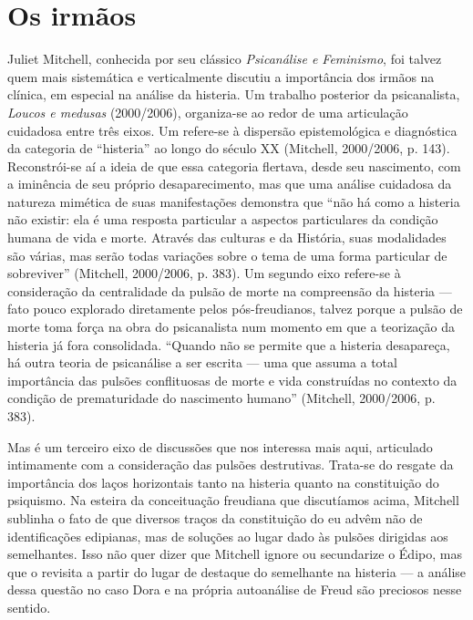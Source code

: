 \section{Os irmãos}

Juliet Mitchell, conhecida por seu clássico \emph{Psicanálise e
Feminismo}, foi talvez quem mais sistemática e verticalmente discutiu a
importância dos irmãos na clínica, em especial na análise da histeria.
Um trabalho posterior da psicanalista, \emph{Loucos e medusas}
(2000/2006), organiza-se ao redor de uma articulação cuidadosa entre
três eixos. Um refere-se à dispersão epistemológica e diagnóstica da
categoria de ``histeria'' ao longo do século XX (Mitchell, 2000/2006, p.
143). Reconstrói-se aí a ideia de que essa categoria flertava, desde seu
nascimento, com a iminência de seu próprio desaparecimento, mas que uma
análise cuidadosa da natureza mimética de suas manifestações demonstra
que ``não há como a histeria não existir: ela é uma resposta particular
a aspectos particulares da condição humana de vida e morte. Através das
culturas e da História, suas modalidades são várias, mas serão todas
variações sobre o tema de uma forma particular de sobreviver''
(Mitchell, 2000/2006, p. 383). Um segundo eixo refere-se à consideração
da centralidade da pulsão de morte na compreensão da histeria --- fato
pouco explorado diretamente pelos pós-freudianos, talvez porque a pulsão
de morte toma força na obra do psicanalista num momento em que a
teorização da histeria já fora consolidada. ``Quando não se permite que
a histeria desapareça, há outra teoria de psicanálise a ser escrita ---
uma que assuma a total importância das pulsões conflituosas de morte e
vida construídas no contexto da condição de prematuridade do nascimento
humano'' (Mitchell, 2000/2006, p. 383).

Mas é um terceiro eixo de discussões que nos interessa mais aqui,
articulado intimamente com a consideração das pulsões destrutivas.
Trata-se do resgate da importância dos laços horizontais tanto na
histeria quanto na constituição do psiquismo. Na esteira da conceituação
freudiana que discutíamos acima, Mitchell sublinha o fato de que
diversos traços da constituição do eu advêm não de identificações
edipianas, mas de soluções ao lugar dado às pulsões dirigidas aos
semelhantes. Isso não quer dizer que Mitchell ignore ou secundarize o
Édipo, mas que o revisita a partir do lugar de destaque do semelhante na
histeria --- a análise dessa questão no caso Dora e na própria
autoanálise de Freud são preciosos nesse sentido.

